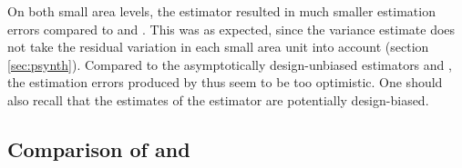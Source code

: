On both small area levels, the \psynth{} estimator resulted in much smaller estimation errors compared to \psmall{} and \extpsynth{}. This was as expected, since the \psynth{} variance estimate does not take the residual variation in each small area unit into account (section \ref{sec:psynth}). Compared to the asymptotically design-unbiased estimators \psmall{} and \extpsynth{}, the estimation errors produced by \psynth{} thus seem to be too optimistic. One should also recall that the estimates of the \psynth{} estimator are potentially design-biased.





\subsection{Comparison of \psmall{} and \extpsynth{}}
\label{sec:comp}


